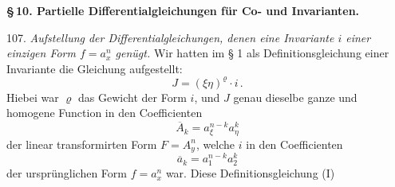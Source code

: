 \documentclass[11pt]{article}
\providecommand{\weq}[2]{\begin{equation}\tag{#1}#2\end{equation}}
\begin{document}
\begin{center}
\textbf{§\,10. Partielle Differentialgleichungen f\"ur Co- und Invarianten.}
\end{center}

107. \textit{Aufstellung der Differentialgleichungen, denen eine Invariante $i$ einer einzigen Form $f = a_x^n$ gen\"ugt.} Wir hatten im § 1 als Definitionsgleichung einer Invariante die Gleichung aufgestellt:
\weq{I}{J = (\xi\eta)^{\varrho} \cdot i\,.}
Hiebei war $\varrho$ das Gewicht der Form $i$, und $J$ genau dieselbe ganze und homogene Function in den Coefficienten
\[
\overline{A}_k = a_{\xi}^{n-k} a_{\eta}^k
\]
der linear transformirten Form $F = A_y^n$, welche $i$ in den Coefficienten
\[
\overline{a}_k = a_1^{n-k} a_2^k
\]
der urspr\"unglichen Form $f = a_x^n$ war. Diese Definitionsgleichung (I)
\end{document}

